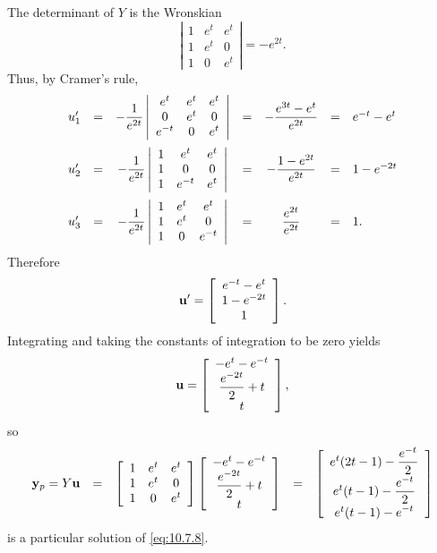 \begin{examplesolution}
\[\]
The determinant of $Y$ is the Wronskian
\[
  \left|
  \begin{array}{ccc}
    1 & e^{t} & e^{t} \\
    1 & e^{t} & 0     \\
    1 & 0     & e^{t}
  \end{array}\right| =-e^{2t}.
\]
Thus, by Cramer's rule,
\[
  \begin{array}{cccccll}
    u_{1}' & = & -\displaystyle\frac{1}{e^{2t}}\left|\begin{array}{ccc}e^{t}&e^{t}&e^{t}\\0&e^{t}&0\\e^{-t}&0&e^{t}\end{array}\right| & = & -\displaystyle\frac{e^{3t}-e^{t}}{e^{2t}} & = & e^{-t}-e^{t} \\[6\jot]
    u_{2}' & = & -\displaystyle\frac{1}{e^{2t}}\left|\begin{array}{ccc}1&e^{t}&e^{t}\\1&0&0\\1&e^{-t}&e^{t}\end{array}\right|         & = & -\displaystyle\frac{1-e^{2t}}{e^{2t}}     & = & 1-e^{-2t}    \\[6\jot]
    u_{3}' & = & -\displaystyle\frac{1}{e^{2t}}\left|\begin{array}{ccc}1&e^{t}&e^{t}\\1&e^{t}&0\\1&0&e^{-t}\end{array}\right|         & = & \displaystyle\frac{e^{2t}}{e^{2t}}        & = & 1.
  \end{array}
\]
Therefore
\[
  {\bf u}'=\left[
  \begin{array}{c}
    e^{-t}-e^{t} \\
    1-e^{-2t}    \\
    1
  \end{array}\right].
\]
Integrating and taking the constants of integration to be zero yields
\[
  {\bf u}=\left[
  \begin{array}{c}
    -e^{t}-e^{-t}           \\
    \displaystyle\frac{e^{-2t}}{2}+t \\
    t
  \end{array}\right],
\]
so
\[
  \begin{array}{ccccl}
    {\bf y}_{p}=Y{\bf u} & = & \left[\begin{array}{ccc}1&e^{t}&e^{t}\\1&e^{t}&0\\1&0&e^{t}\end{array}\right] \left[\begin{array}{c}-e^{t}-e^{-t}\\\displaystyle\frac{e^{-2t}}{2}+t\\t\end{array}\right] & = & \left[\begin{array}{c}e^{t}(2t-1)-\displaystyle\frac{e^{-t}}{2}\\[5pt]e^{t}(t-1)-\displaystyle\frac{e^{-t}}{2}\\[5pt]e^{t}(t-1)-\displaystyle{e^{-t}}\end{array}\right]
  \end{array}
\]
is a particular solution of \eqref{eq:10.7.8}.


\end{examplesolution}
